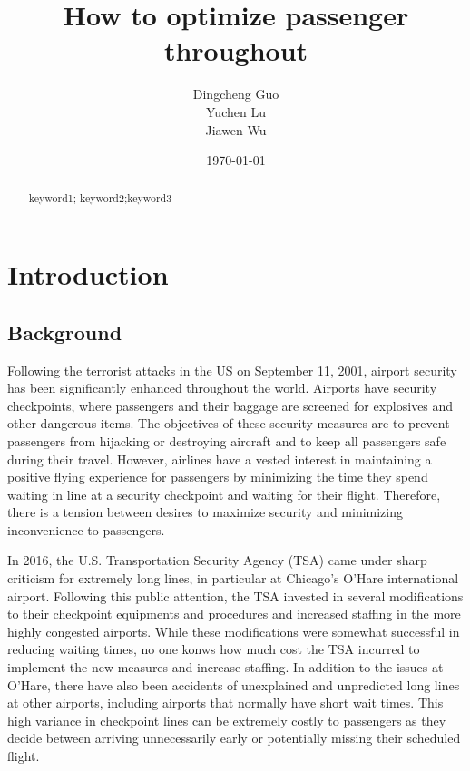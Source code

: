 \documentclass{mcmthesis}
\title{How to optimize passenger throughout}
\author{Dingcheng Guo \\ Yuchen Lu \\ Jiawen Wu}
\date{\today}
\begin{document}
\begin{abstract}

\begin{keywords}
keyword1; keyword2;keyword3%
\end{keywords}
\end{abstract}

\maketitle
\section{Introduction}%
\subsection{Background}%
Following the terrorist attacks in the US on September 11, 2001, airport security has been significantly enhanced throughout the world. Airports have security checkpoints, where passengers and their baggage are screened for explosives and other dangerous items. The objectives of these security measures are to prevent passengers from hijacking or destroying aircraft and to keep all passengers safe during their travel. However, airlines have a vested interest in maintaining a positive flying experience for passengers by minimizing the time they spend waiting in line at a security checkpoint and waiting for their flight. Therefore, there is a tension between desires to maximize security and minimizing inconvenience to passengers.

In 2016, the U.S. Transportation Security Agency (TSA) came under sharp criticism for extremely long lines, in particular at Chicago's O'Hare international airport. Following this public attention, the TSA invested in several modifications to their checkpoint equipments and procedures and increased staffing in the more highly congested airports. While these modifications were somewhat successful in reducing waiting times, no one konws how much cost the TSA incurred to implement the new measures and increase staffing. In addition to the issues at O'Hare, there have also been accidents of unexplained and unpredicted long lines at other airports, including airports that normally have short wait times. This high variance in checkpoint lines can be extremely costly to passengers as they decide between arriving unnecessarily early or potentially missing their scheduled flight. 
\end{document}
